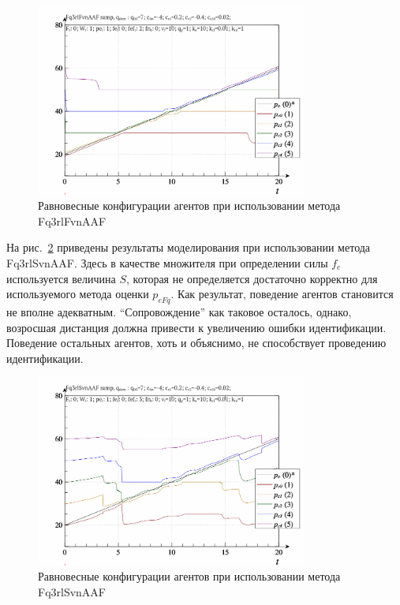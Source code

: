 \begin{figure}[htb!]
  \begin{center}
    \includegraphics[width=0.8\textwidth]{p/ramp/qls-p_t_pi_Fq3rlFvnAAF_ramp.png}
  \end{center}
  \caption{Равновесные конфигурации агентов при использовании метода Fq3rlFvnAAF}
  \label{atu:f:qls_ramp_Fq3rlFvnAAF}
\end{figure}

На рис.~\ref{atu:f:qls_ramp_Fq3rlSvnAAF} приведены результаты моделирования
при использовании метода Fq3rlSvnAAF.
Здесь в качестве множителя при определении силы $f_e$ используется
величина $S$, которая не определяется достаточно корректно
для используемого метода оценки $p_{eFq}$. Как результат,
поведение агентов становится не вполне адекватным.
``Сопровождение'' как таковое осталось, однако,
возросшая дистанция должна привести к увеличению ошибки идентификации.
Поведение остальных агентов, хоть и объяснимо, не способствует
проведению идентификации.

\begin{figure}[htb!]
  \begin{center}
    \includegraphics[width=0.8\textwidth]{p/ramp/qls-p_t_pi_Fq3rlSvnAAF_ramp.png}
  \end{center}
  \caption{Равновесные конфигурации агентов при использовании метода Fq3rlSvnAAF}
  \label{atu:f:qls_ramp_Fq3rlSvnAAF}
\end{figure}


